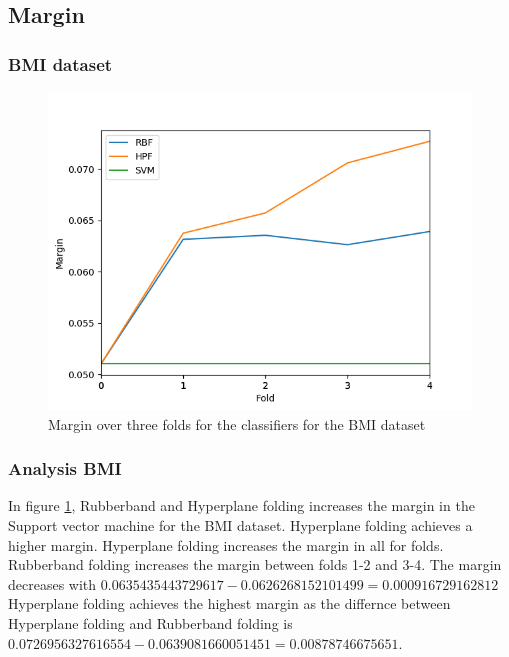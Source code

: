 \documentclass[a4paper,twoside]{bth}
\begin{document}
\FloatBarrier


\subsection{Margin}
\subsubsection{BMI dataset}
\begin{figure}[!htb]
\centering
\includegraphics[scale=0.7]{images/result-bmi/Margin.png}
   \caption{Margin over three folds for the classifiers for the BMI dataset}
   \label{fig:bmi-margin}
\end{figure}

\FloatBarrier

\subsubsection{Analysis BMI}
In figure \ref{fig:bmi-margin}, Rubberband and Hyperplane folding increases the margin in the Support vector machine for the BMI dataset. Hyperplane folding achieves a higher margin. Hyperplane folding increases the margin in all for folds. Rubberband folding increases the margin between folds 1-2 and 3-4. The margin decreases with $0.0635435443729617 - 0.0626268152101499 = 0.000916729162812$ Hyperplane folding achieves the highest margin as the differnce between Hyperplane folding and Rubberband folding is $0.0726956327616554 - 0.0639081660051451 = 0.00878746675651$. 

\clearpage
\FloatBarrier
\end{document}
